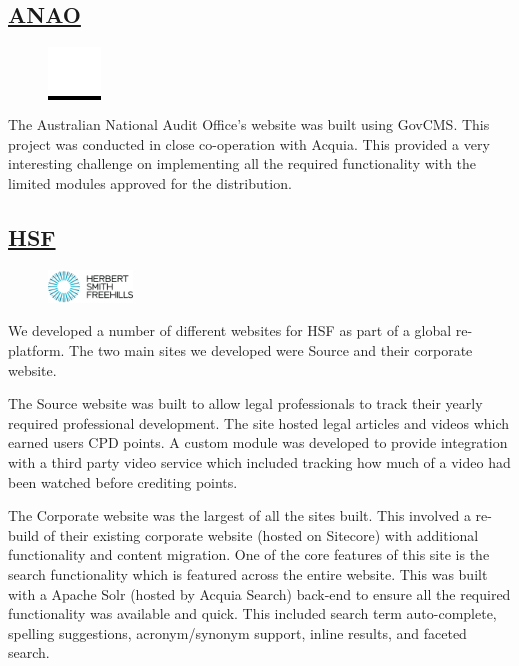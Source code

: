\documentclass[11pt,a4paper,sans]{moderncv}        %
\begin{document}
  \subsection{\href{https://www.anao.gov.au/}{\ac{ANAO}}}
    \begin{figure}
      \vspace{-15pt}
      \colorbox{black}{\includegraphics[width=0.125\textwidth]{ANAO_logo}}
      \vspace{-25pt}
    \end{figure}
    The Australian National Audit Office's website was built using GovCMS\@. This project was conducted in close co-operation with Acquia. This provided a very interesting challenge on implementing all the required functionality with the limited modules approved for the distribution.

  \subsection{\href{https://www.herbertsmithfreehills.com/}{\ac{HSF}}}
    \begin{figure}
      \vspace{-10pt}
      \includegraphics[width=0.2\textwidth]{HSF_logo}
      \vspace{-10pt}
    \end{figure}
    We developed a number of different websites for \ac{HSF} as part of a global re-platform. The two main sites we developed were Source and their corporate website.

    The Source website was built to allow legal professionals to track their yearly required professional development. The site hosted legal articles and videos which earned users \ac{CPD} points. A custom module was developed to provide integration with a third party video service which included tracking how much of a video had been watched before crediting points.

    The Corporate website was the largest of all the sites built. This involved a re-build of their existing corporate website (hosted on Sitecore) with additional functionality and content migration. One of the core features of this site is the search functionality which is featured across the entire website. This was built with a Apache Solr (hosted by Acquia Search) back-end to ensure all the required functionality was available and quick. This included search term auto-complete, spelling suggestions, acronym/synonym support, inline results, and faceted search.
\end{document}
